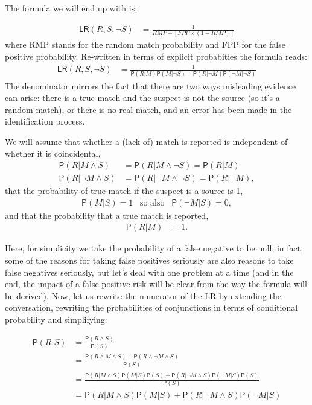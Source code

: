 \documentclass[
  10pt,
  dvipsnames,enabledeprecatedfontcommands]{scrartcl}
\newcommand{\n}{\neg}
\newcommand{\et}{\wedge}
\newcommand{\pr}[1]{\mathsf{P}(#1)}
\begin{document}
The formula we will end up with is:

\begin{align}
\tag{FPP-LR} \mathsf{LR}(R, S, \n S) & = \frac{1}{RMP + [ FPP \times (1-RMP)]}
\end{align} \noindent where RMP stands for the random match probability
and FPP for the false positive probability. Re-written in terms of
explicit probabities the formula reads: \begin{align*}
\mathsf{LR}(R,S, \n S) & = \frac{1}
{\pr{R \vert  M}\pr{ M \vert \n S} + \pr{R \vert \n M}\pr{\n M \vert \n S}}
\end{align*} \noindent The denominator mirrors the fact that there are
two ways misleading evidence can arise: there is a true match and the
suspect is not the source (so it's a random match), or there is no real
match, and an error has been made in the identification process.

We will assume that whether a (lack of) match is reported is independent
of whether it is coincidental, \begin{align}
\label{eq:indOnS}
\pr{R \vert M \et S} & = \pr{R \vert M \et \n S} = \pr{R \vert M}
\\ \nonumber
\pr{R \vert \n M \et S} & = \pr{R \vert\n M \et \n S} = \pr{R \vert \n M},
\end{align} \noindent  that the probability of true match if the suspect
is a source is 1, \begin{align}
\label{eq:ifSthenM}
\pr{M\vert S} = 1  \,\,\, \mbox{ so also } \,\,\, \pr{\n M \vert S}=0,
\end{align} \noindent and that the probability that a true match is
reported, \begin{align}
\label{eq:fnNull}
\pr{R \vert M} & = 1.
\end{align}

Here, for simplicity we take the probability of a false negative to be
null; in fact, some of the reasons for taking false positives seriously
are also reasons to take false negatives seriously, but let's deal with
one problem at a time (and in the end, the impact of a false positive
risk will be clear from the way the formula will be derived). Now, let
us rewrite the numerator of the LR by extending the conversation,
rewriting the probabilities of conjunctions in terms of conditional
probability and simplifying:

\begin{align}
\label{eq:numer}
\pr{R\vert S} & = \frac{\pr{R\et S}}{\pr{S}} \\ \nonumber
& = \frac{\pr{R \et M \et S} + \pr{R \et \n M \et S}}
{\pr{S}}  \\ \nonumber
& = \frac{\pr{R \vert M \et S}\pr{M \vert S}\pr{S} + \pr{R \vert \n M \et S}\pr{\n M \vert S}\pr{S}}
{\pr{S}}  \\ \nonumber 
& = \pr{R \vert M \et S}\pr{M \vert S} + \pr{R \vert \n M \et S}\pr{\n M \vert S}
\end{align}
\end{document}
